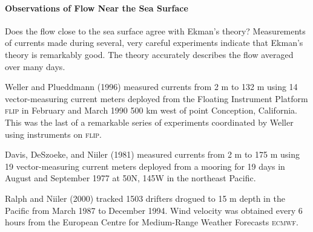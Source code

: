 \paragraph{Observations of Flow Near the Sea Surface}
Does the flow close to the sea
surface agree with Ekman's theory? Measurements of currents made
during several, very careful experiments indicate that Ekman's theory
is remarkably good. The theory accurately describes the flow averaged
over many days.

Weller and Plueddmann (1996) measured currents from 2 m to 132 m using
14 vector-measuring current meters deployed from the Floating
Instrument Platform \textsc{flip} in February and March 1990 500 km
west of point Conception, California.  This was the last of a
remarkable series of experiments coordinated by Weller using
instruments on \textsc{flip}.

Davis, DeSzoeke, and Niiler (1981) measured currents from 2 m to 175 m
using 19 vector-measuring current meters deployed from a mooring for
19 days in August and September 1977 at 50\degrees N, 145\degrees W in
the northeast Pacific.

Ralph and Niiler (2000) tracked 1503
drifters drogued to 15 m
depth in the Pacific from March 1987 to December 1994. Wind velocity
was obtained every 6 hours from the European Centre for Medium-Range
Weather Forecasts \textsc{ecmwf}.

